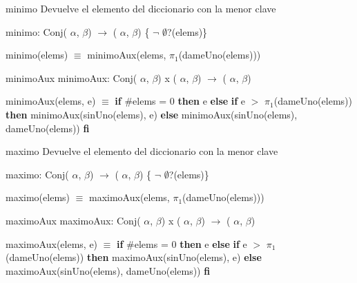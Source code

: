 \begin{DoxyParagraph}{minimo}
\-Devuelve el elemento del diccionario con la menor clave \par
 minimo\-: \-Conj( $\alpha$, $\beta$) $\to$ ( $\alpha$, $\beta$) \{ $\lnot$ $\emptyset$?(elems)\}\par
 minimo(elems) $\equiv$ minimo\-Aux(elems, $\pi_1$(dame\-Uno(elems))) 
\end{DoxyParagraph}
\begin{DoxyParagraph}{minimo\-Aux}
minimo\-Aux\-: \-Conj( $\alpha$, $\beta$) x ( $\alpha$, $\beta$) $\to$ ( $\alpha$, $\beta$)\par
 minimo\-Aux(elems, e) $\equiv$ {\bfseries if} \#elems = 0 {\bfseries then} e {\bfseries else} {\bfseries if} e $>$ $\pi_1$(dame\-Uno(elems)) {\bfseries then} minimo\-Aux(sin\-Uno(elems), e) {\bfseries else} minimo\-Aux(sin\-Uno(elems), dame\-Uno(elems)) {\bfseries fi} 
\end{DoxyParagraph}
\begin{DoxyParagraph}{maximo}
\-Devuelve el elemento del diccionario con la menor clave\par
 maximo\-: \-Conj( $\alpha$, $\beta$) $\to$ ( $\alpha$, $\beta$) \{ $\lnot$ $\emptyset$?(elems)\}\par
 maximo(elems) $\equiv$ maximo\-Aux(elems, $\pi_1$(dame\-Uno(elems))) 
\end{DoxyParagraph}
\begin{DoxyParagraph}{maximo\-Aux}
maximo\-Aux\-: \-Conj( $\alpha$, $\beta$) x ( $\alpha$, $\beta$) $\to$ ( $\alpha$, $\beta$)\par
 maximo\-Aux(elems, e) $\equiv$ {\bfseries if} \#elems = 0 {\bfseries then} e {\bfseries else} {\bfseries if} e $>$ $\pi_1$(dame\-Uno(elems)) {\bfseries then} maximo\-Aux(sin\-Uno(elems), e) {\bfseries else} maximo\-Aux(sin\-Uno(elems), dame\-Uno(elems)) {\bfseries fi}  
\end{DoxyParagraph}
